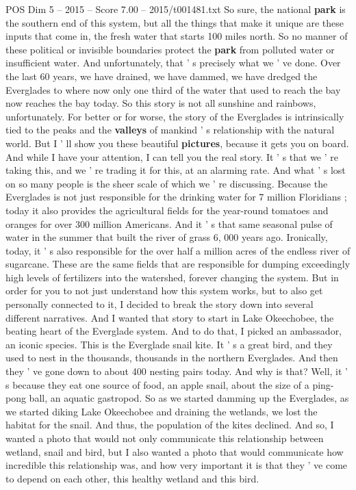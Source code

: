 \begin{textsample}{POS Dim 5 – 2015 – Score 7.00 – 2015/t001481.txt}
So sure, the national \textbf{park} is the southern end of this system, but all the things that make it unique are these inputs that come in, the fresh water that starts 100 miles north.
So no manner of these political or invisible boundaries protect the \textbf{park} from polluted water or insufficient water.
And unfortunately, that ' s precisely what we ' ve done.
Over the last 60 years, we have drained, we have dammed, we have dredged the Everglades to where now only one third of the water that used to reach the bay now reaches the bay today.
So this story is not all sunshine and rainbows, unfortunately.
For better or for worse, the story of the Everglades is intrinsically tied to the peaks and the \textbf{valleys} of mankind ' s relationship with the natural world.
But I ' ll show you these beautiful \textbf{pictures}, because it gets you on board.
And while I have your attention, I can tell you the real story.
It ' s that we ' re taking this, and we ' re trading it for this, at an alarming rate.
And what ' s lost on so many people is the sheer scale of which we ' re discussing.
Because the Everglades is not just responsible for the drinking water for 7 million Floridians ; today it also provides the agricultural fields for the year-round tomatoes and oranges for over 300 million Americans.
And it ' s that same seasonal pulse of water in the summer that built the river of grass 6, 000 years ago.
Ironically, today, it ' s also responsible for the over half a million acres of the endless river of sugarcane.
These are the same fields that are responsible for dumping exceedingly high levels of fertilizers into the watershed, forever changing the system.
But in order for you to not just understand how this system works, but to also get personally connected to it, I decided to break the story down into several different narratives.
And I wanted that story to start in Lake Okeechobee, the beating heart of the Everglade system.
And to do that, I picked an ambassador, an iconic species.
This is the Everglade snail kite.
It ' s a great bird, and they used to nest in the thousands, thousands in the northern Everglades.
And then they ' ve gone down to about 400 nesting pairs today.
And why is that?
Well, it ' s because they eat one source of food, an apple snail, about the size of a ping-pong ball, an aquatic gastropod.
So as we started damming up the Everglades, as we started diking Lake Okeechobee and draining the wetlands, we lost the habitat for the snail.
And thus, the population of the kites declined.
And so, I wanted a photo that would not only communicate this relationship between wetland, snail and bird, but I also wanted a photo that would communicate how incredible this relationship was, and how very important it is that they ' ve come to depend on each other, this healthy wetland and this bird.

\end{textsample}
